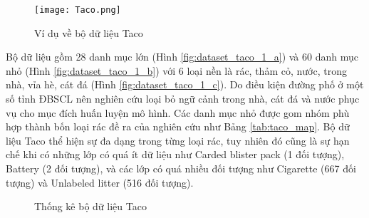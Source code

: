 \documentclass[../the.tex]{subfiles}
\begin{document}
\begin{figure}[H]
	\centering
	\texttt{[image: Taco.png]}
	\caption{Ví dụ về bộ dữ liệu Taco \cite{proença2020taco}}
	\label{fig:dataset_taco}
\end{figure}
{\fontsize{13}{12} \selectfont

Bộ dữ liệu gồm 28 danh mục lớn  (Hình \ref{fig:dataset_taco_1_a}) và 60 danh mục nhỏ (Hình \ref{fig:dataset_taco_1_b}) với
6 loại nền là rác, thảm cỏ, nước, trong nhà, vỉa hè, cát đá (Hình \ref{fig:dataset_taco_1_c}). Do
điều kiện đường phố ở một số tỉnh ĐBSCL nên nghiên cứu loại bỏ ngữ cảnh trong nhà, cát đá và nước phục vụ cho mục đích huấn luyện mô hình. Các danh
mục nhỏ được gom nhóm phù hợp thành bốn loại rác đề ra của nghiên cứu như Bảng \ref{tab:taco_map}. Bộ dữ liệu Taco thể hiện sự đa dạng trong từng loại rác,
tuy nhiên đó cũng là sự hạn chế khi có những lớp có quá ít dữ liệu như Carded blister pack (1 đối tượng), Battery (2 đối tượng), và các lớp có quá nhiều đối tượng như Cigarette (667 đối tượng) và Unlabeled litter (516 đối tượng).
}

\begin{figure}[H]	
	\centering
	\qquad
	\qquad
	\caption{Thống kê bộ dữ liệu Taco}%
	\label{fig:dataset_taco_1}
\end{figure}
\end{document}
